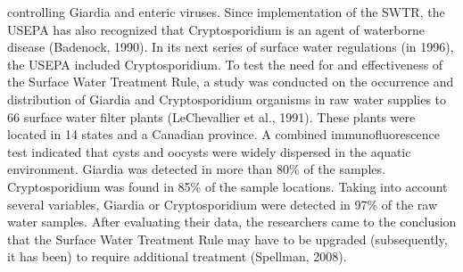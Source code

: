 \documentclass{article}
\begin{document}
controlling Giardia and enteric viruses. Since implementation of the
SWTR, the USEPA has also recognized that Cryptosporidium is an agent of
waterborne disease (Badenock, 1990). In its next series of surface water
regulations (in 1996), the USEPA included Cryptosporidium. To test the
need for and effectiveness of the Surface Water Treatment Rule, a study
was conducted on the occurrence and distribution of Giardia and
Cryptosporidium organisms in raw water supplies to 66 surface water
filter plants (LeChevallier et al., 1991). These plants were located in
14 states and a Canadian province. A combined immunofluorescence test
indicated that cysts and oocysts were widely dispersed in the aquatic
environment. Giardia was detected in more than 80\% of the samples.
Cryptosporidium was found in 85\% of the sample locations. Taking into
account several variables, Giardia or Cryptosporidium were detected in
97\% of the raw water samples. After evaluating their data, the
researchers came to the conclusion that the Surface Water Treatment Rule
may have to be upgraded (subsequently, it has been) to require
additional treatment (Spellman, 2008).
\end{document}
